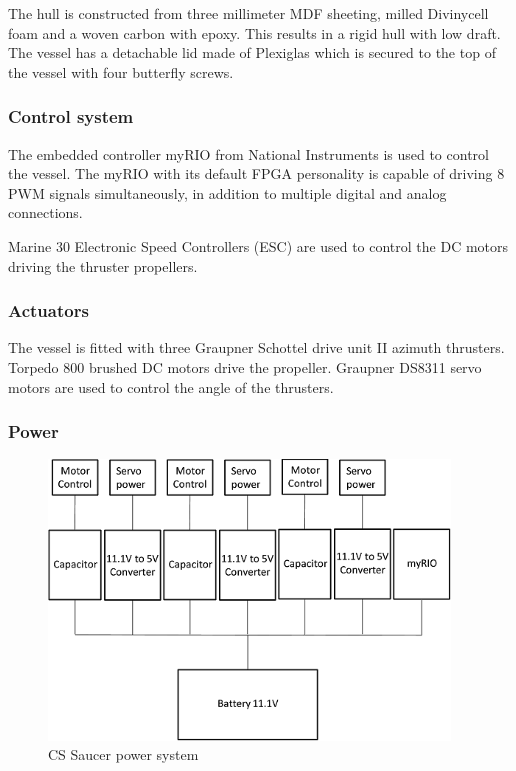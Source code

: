 \documentclass[a4paper,twoside,english]{report}
\begin{document}
The hull is constructed from three millimeter MDF sheeting, milled
Divinycell foam and a woven carbon with epoxy. This results in a rigid
hull with low draft. The vessel has a detachable lid made of Plexiglas
which is secured to the top of the vessel with four butterfly screws.

\subsubsection{Control system}

The embedded controller myRIO from National Instruments is used to
control the vessel. The myRIO with its default FPGA personality is
capable of driving 8 PWM signals simultaneously, in addition to multiple
digital and analog connections. 

Marine 30 Electronic Speed Controllers (ESC) are used to control the
DC motors driving the thruster propellers.

\subsubsection{Actuators}

The vessel is fitted with three Graupner Schottel drive unit II azimuth
thrusters. Torpedo 800 brushed DC motors drive the propeller. Graupner
DS8311 servo motors are used to control the angle of the thrusters.

\subsubsection{Power}

\begin{figure}
\centering \includegraphics[width=0.95\textwidth]{fig/CSSaucer_power}
\caption{\label{fig: CS Saucer power}CS Saucer power system}
\end{figure}
\end{document}
